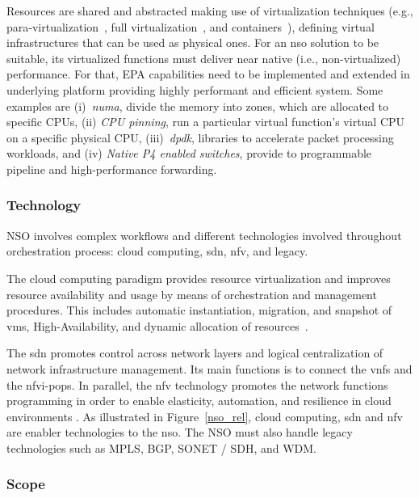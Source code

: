 Resources are shared and abstracted making use of virtualization techniques (e.g., para-virtualization~\cite{4299349}, full virtualization~\cite{4482796}, and containers~\cite{6906035}), defining virtual infrastructures that can be used as physical ones.
For an \gls{nso} solution to be suitable, its virtualized functions must deliver near native (i.e., non-virtualized) performance. For that, EPA capabilities need to be implemented and extended in underlying platform providing highly performant and efficient system. Some examples are (i)\textit{~\gls{numa}}, divide the memory into zones, which are allocated to specific CPUs, (ii) \textit{CPU pinning}, run a particular virtual function’s virtual CPU on a specific physical CPU, (iii)~\textit{\gls{dpdk}}, libraries to accelerate packet processing workloads, and (iv) \textit{Native P4 enabled switches}, provide to programmable pipeline and high-performance forwarding. 

\subsubsection{Technology}
NSO involves complex workflows and different technologies involved throughout orchestration process: cloud computing, \gls{sdn}, \gls{nfv}, and legacy.      

The cloud computing paradigm provides resource virtualization and improves resource availability and usage by means of orchestration and management procedures. This includes automatic instantiation, migration, and snapshot of \glspl{vm}, High-Availability, and dynamic allocation of resources~\cite{ETSI2012NetworkAction}. 

The \gls{sdn} promotes control across network layers and logical centralization of network infrastructure management. Its main functions is to connect the \glspl{vnf} and the \gls{nfvi}-\glspl{pop}. In parallel, the \gls{nfv} technology promotes the network functions programming in order to enable elasticity, automation, and resilience in cloud environments \cite{Rotsos2017NetworkSurvey}. As illustrated in Figure~\ref{nso_rel}, cloud computing, \gls{sdn} and \gls{nfv} are enabler technologies to the \gls{nso}. The NSO must also handle legacy technologies such as MPLS, BGP, SONET / SDH, and WDM. 

\subsubsection{Scope}

